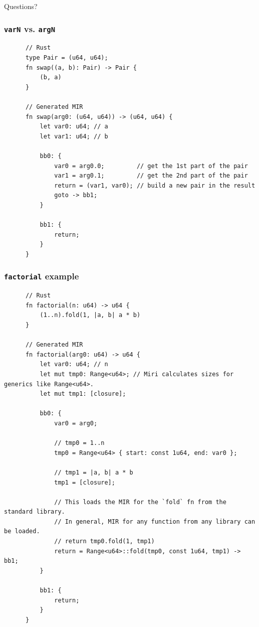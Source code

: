 \documentclass{beamer}
\begin{document}
\begin{frame}
  \begin{center}
    \LARGE{Questions?}
  \end{center}
\end{frame}


\begin{frame}[fragile]
  \frametitle{\texttt{varN} vs. \texttt{argN}}
  \begin{center}
    \begin{verbatim}
      // Rust
      type Pair = (u64, u64);
      fn swap((a, b): Pair) -> Pair {
          (b, a)
      }

      // Generated MIR
      fn swap(arg0: (u64, u64)) -> (u64, u64) {
          let var0: u64; // a
          let var1: u64; // b

          bb0: {
              var0 = arg0.0;         // get the 1st part of the pair
              var1 = arg0.1;         // get the 2nd part of the pair
              return = (var1, var0); // build a new pair in the result
              goto -> bb1;
          }

          bb1: {
              return;
          }
      }
    \end{verbatim}
  \end{center}
\end{frame}

\begin{frame}[fragile]
  \frametitle{\texttt{factorial} example}
  \begin{center}
    \begin{verbatim}
      // Rust
      fn factorial(n: u64) -> u64 {
          (1..n).fold(1, |a, b| a * b)
      }

      // Generated MIR
      fn factorial(arg0: u64) -> u64 {
          let var0: u64; // n
          let mut tmp0: Range<u64>; // Miri calculates sizes for generics like Range<u64>.
          let mut tmp1: [closure];

          bb0: {
              var0 = arg0;

              // tmp0 = 1..n
              tmp0 = Range<u64> { start: const 1u64, end: var0 };

              // tmp1 = |a, b| a * b
              tmp1 = [closure];

              // This loads the MIR for the `fold` fn from the standard library.
              // In general, MIR for any function from any library can be loaded.
              // return tmp0.fold(1, tmp1)
              return = Range<u64>::fold(tmp0, const 1u64, tmp1) -> bb1;
          }

          bb1: {
              return;
          }
      }
    \end{verbatim}
  \end{center}
\end{frame}
\end{document}
